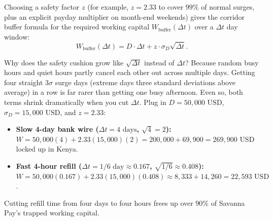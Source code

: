 Choosing a safety factor $z$ (for example, $z = 2.33$ to cover $99\%$ of normal surges, plus an explicit payday multiplier on month-end weekends) gives the corridor buffer formula for the required working capital $W_{\text{buffer}}(\Delta t)$ over a $\Delta t$ day window:
\[
  W_{\text{buffer}}(\Delta t) = D \cdot \Delta t + z \cdot \sigma_D \sqrt{\Delta t}.
\]

\begin{intuitionbox}
Why does the safety cushion grow like $\sqrt{\Delta t}$ instead of $\Delta t$? Because random busy hours and quiet hours partly cancel each other out across multiple days. Getting four straight $3\sigma$ surge days (extreme days three standard deviations above average) in a row is far rarer than getting one busy afternoon. Even so, both terms shrink dramatically when you cut $\Delta t$. Plug in $D = 50{,}000\text{ USD}$, $\sigma_D = 15{,}000\text{ USD}$, and $z = 2.33$:
\begin{itemize}
  \item \textbf{Slow 4-day bank wire ($\Delta t = 4\text{ days}$, $\sqrt{4} = 2$):} $W = 50{,}000(4) + 2.33(15{,}000)(2) = 200{,}000 + 69{,}900 = 269{,}900\text{ USD}$ locked up in Kenya.
  \item \textbf{Fast 4-hour refill ($\Delta t = 1/6\text{ day} \approx 0.167$, $\sqrt{1/6} \approx 0.408$):} $W = 50{,}000(0.167) + 2.33(15{,}000)(0.408) \approx 8{,}333 + 14{,}260 = 22{,}593\text{ USD}$.
\end{itemize}
Cutting refill time from four days to four hours frees up over $90\%$ of Savanna Pay's trapped working capital.
\end{intuitionbox}

